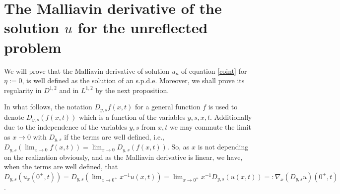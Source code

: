 \documentclass[reqno]{amsart}
\numberwithin{equation}{section}
\begin{document}
\section{The Malliavin derivative of the solution $u$ for the unreflected problem}
We will prove that the Malliavin derivative of solution $u_n $ of equation \eqref{coint} for $\eta:=0$, is well defined as the solution of an s.p.d.e. Moreover, we shall prove its regularity in
$D^{1,2}$ and in $L^{1,2}$ by the next proposition.

In what follows, the notation $D_{y,s}f(x,t)$ for a general
function $f$ is used to denote $D_{y,s}(f(x,t))$ which is a
function of the variables $y,s,x,t$. Additionally due to the
independence of the variables $y,s$ from $x,t$ we may commute the
limit as $x\rightarrow 0$ with $D_{y,s}$ if the terms are well
defined, i.e., $D_{y,s}(\displaystyle{\lim_{x\rightarrow
0}}f(x,t))=\displaystyle{\lim_{x\rightarrow 0}}D_{y,s}(f(x,t))$.
So, as $x$ is not depending on the realization obviously, and as
the Malliavin derivative is linear, we have, when the terms are
well defined, that
$D_{y,s}(u_x(0^+,t))=D_{y,s}(\displaystyle{\lim_{x\rightarrow
0^+}}x^{-1}u(x,t))=\displaystyle{\lim_{x\rightarrow
0^+}}x^{-1}D_{y,s}(u(x,t))=:\nabla_x(D_{y,s}u)(0^+,t)$.
\end{document}
